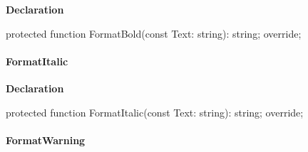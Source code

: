 \documentclass{report}
\newif\ifpdf
\begin{document}
\label{PasDoc_GenHtml.TGenericHTMLDocGenerator-FormatBold}
\begin{list}{}{
\setlength{\itemindent}{0cm}
\setlength{\listparindent}{0cm}
\setlength{\leftmargin}{\evensidemargin}
\addtolength{\leftmargin}{\tmplength}
\settowidth{\labelsep}{X}
\addtolength{\leftmargin}{\labelsep}
\setlength{\labelwidth}{\tmplength}
}
\item[\textbf{Declaration}\hfill]
\ifpdf
\begin{flushleft}
\fi
\begin{ttfamily}
protected function FormatBold(const Text: string): string; override;\end{ttfamily}

\ifpdf
\end{flushleft}
\fi

\end{list}
\paragraph*{FormatItalic}\hspace*{\fill}

\label{PasDoc_GenHtml.TGenericHTMLDocGenerator-FormatItalic}
\begin{list}{}{
\setlength{\itemindent}{0cm}
\setlength{\listparindent}{0cm}
\setlength{\leftmargin}{\evensidemargin}
\addtolength{\leftmargin}{\tmplength}
\settowidth{\labelsep}{X}
\addtolength{\leftmargin}{\labelsep}
\setlength{\labelwidth}{\tmplength}
}
\item[\textbf{Declaration}\hfill]
\ifpdf
\begin{flushleft}
\fi
\begin{ttfamily}
protected function FormatItalic(const Text: string): string; override;\end{ttfamily}

\ifpdf
\end{flushleft}
\fi

\end{list}
\paragraph*{FormatWarning}\hspace*{\fill}
\end{document}
